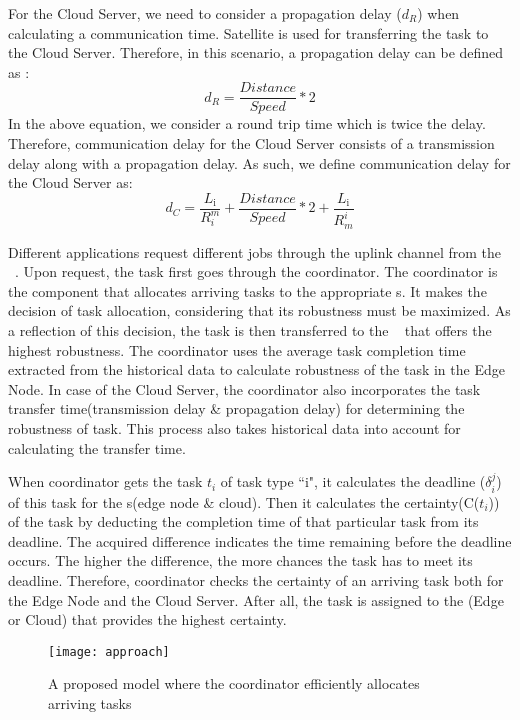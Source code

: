 For the Cloud Server, we need to consider a propagation delay ($d_R$) when calculating a communication time. Satellite is used for transferring the task to the Cloud Server. Therefore, in this scenario, a propagation delay can be defined as : 
\begin{equation} 
    d_R = \frac{Distance}{Speed} * 2
\end{equation}
In the above equation, we consider a round trip time which is twice the delay. Therefore, communication delay for the Cloud Server consists of a transmission delay along with a propagation delay. As such, we define communication delay for  the Cloud Server as: 
\begin{equation} 
    d_C =  \frac{L_\textrm{i}}{R_i^m} +\frac{Distance}{Speed} * 2 + \frac{L_\textrm{i}}{R_m^i}
\end{equation}

Different applications request different jobs through the uplink channel from the \pu~. Upon request, the task first goes through the coordinator. The coordinator is the component that allocates arriving tasks to the appropriate \pu s. It makes the decision of task allocation, considering that its robustness must be maximized. As a reflection of this decision, the task is then transferred to the \pu~ that offers the highest robustness. The coordinator uses the average task completion time extracted from the historical data to calculate robustness of the task in the Edge Node. In case of the Cloud Server, the coordinator also incorporates the task transfer time(transmission delay \& propagation delay) for determining the robustness of task. This process also takes historical data into account for calculating the transfer time.

When coordinator gets the task $t_i$  of task type ``i", it calculates the deadline ($\delta_i^j$) of this task for the \pu s(edge node \& cloud). Then it calculates the certainty(C($t_i$)) of the task by deducting the completion time of that particular task from its deadline. The acquired difference indicates the time remaining before the deadline occurs. The higher the difference, the more chances the task has to meet its deadline. Therefore, coordinator checks the certainty of an arriving task both for the Edge Node and the Cloud Server. After all, the task is assigned to the \pu(Edge or Cloud) that provides the highest certainty.

\begin{figure}[h!]
	\centering
	\texttt{[image: approach]}
	\caption{A proposed model where the coordinator efficiently allocates arriving tasks}
\end{figure}


